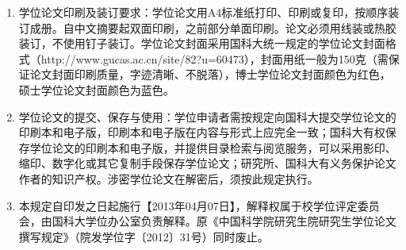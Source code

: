 \begin{enumerate}
  \item 学位论文印刷及装订要求：学位论文用A4标准纸打印、印刷或复印，按顺序装订成册。自中文摘要起双面印刷，之前部分单面印刷。论文必须用线装或热胶装订，不使用钉子装订。学位论文封面采用国科大统一规定的学位论文封面格式（http://www.gucas.ac.cn/site/82?u=60473），封面用纸一般为150克（需保证论文封面印刷质量，字迹清晰、不脱落），博士学位论文封面颜色为红色，硕士学位论文封面颜色为蓝色。

  \item 学位论文的提交、保存与使用：学位申请者需按规定向国科大提交学位论文的印刷本和电子版，印刷本和电子版在内容与形式上应完全一致；国科大有权保存学位论文的印刷本和电子版，并提供目录检索与阅览服务，可以采用影印、缩印、数字化或其它复制手段保存学位论文；研究所、国科大有义务保护论文作者的知识产权。涉密学位论文在解密后，须按此规定执行。

  \item 本规定自印发之日起施行【2013年04月07日】，解释权属于校学位评定委员会，由国科大学位办公室负责解释。原《中国科学院研究生院研究生学位论文撰写规定》（院发学位字〔2012〕31号）同时废止。
\end{enumerate}
